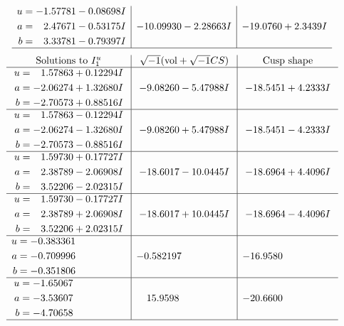 \documentclass[1p]{elsarticle_modified}
\theoremstyle{definition}
\newcommand{\I}{\sqrt{-1}}
\begin{document}
$$\begin{array}{c|c|c}
\begin{aligned}
u &= -1.57781 - 0.08698 I \\
a &= \phantom{-}2.47671 - 0.53175 I \\
b &= \phantom{-}3.33781 - 0.79397 I\end{aligned}
 & -10.09930 - 2.28663 I & -19.0760 + 2.3439 I\\
 \hline 
 \end{array}$$\newpage$$\begin{array}{c|c|c}  
\text{Solutions to }I^u_{1}& \I (\text{vol} + \sqrt{-1}CS) & \text{Cusp shape}\\
 \hline 
\begin{aligned}
u &= \phantom{-}1.57863 + 0.12294 I \\
a &= -2.06274 + 1.32680 I \\
b &= -2.70573 + 0.88516 I\end{aligned}
 & -9.08260 - 5.47988 I & -18.5451 + 4.2333 I \\ \hline\begin{aligned}
u &= \phantom{-}1.57863 - 0.12294 I \\
a &= -2.06274 - 1.32680 I \\
b &= -2.70573 - 0.88516 I\end{aligned}
 & -9.08260 + 5.47988 I & -18.5451 - 4.2333 I \\ \hline\begin{aligned}
u &= \phantom{-}1.59730 + 0.17727 I \\
a &= \phantom{-}2.38789 - 2.06908 I \\
b &= \phantom{-}3.52206 - 2.02315 I\end{aligned}
 & -18.6017 - 10.0445 I & -18.6964 + 4.4096 I \\ \hline\begin{aligned}
u &= \phantom{-}1.59730 - 0.17727 I \\
a &= \phantom{-}2.38789 + 2.06908 I \\
b &= \phantom{-}3.52206 + 2.02315 I\end{aligned}
 & -18.6017 + 10.0445 I & -18.6964 - 4.4096 I \\ \hline\begin{aligned}
u &= -0.383361\phantom{ +0.000000I} \\
a &= -0.709996\phantom{ +0.000000I} \\
b &= -0.351806\phantom{ +0.000000I}\end{aligned}
 & -0.582197\phantom{ +0.000000I} & -16.9580\phantom{ +0.000000I} \\ \hline\begin{aligned}
u &= -1.65067\phantom{ +0.000000I} \\
a &= -3.53607\phantom{ +0.000000I} \\
b &= -4.70658\phantom{ +0.000000I}\end{aligned}
 & \phantom{-}15.9598\phantom{ +0.000000I} & -20.6600\phantom{ +0.000000I}\\
 \hline 
 \end{array}$$\newpage\newpage\renewcommand{\arraystretch}{1}
\end{document}
